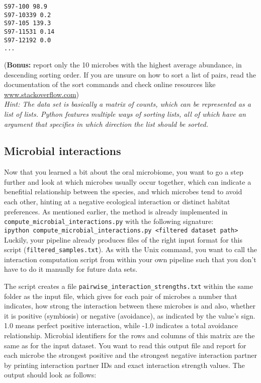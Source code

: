 \documentclass[12pt]{article}
\begin{document}
\begin{verbatim}
S97-100 98.9
S97-10339 0.2
S97-105 139.3
S97-11531 0.14
S97-12192 0.0
...
\end{verbatim}

\noindent(\textbf{Bonus:} report only the 10 microbes with the highest average abundance, in descending sorting order. If you are unsure on how to sort a list of pairs, read the documentation of the sort commands and check online resources like \url{www.stackoverflow.com})\\


\noindent\emph{Hint: The data set is basically a matrix of counts, which can be represented as a list of lists. Python features multiple ways of sorting lists, all of which have an argument that specifies in which direction the list should be sorted.}

\subsection{Microbial interactions}

Now that you learned a bit about the oral microbiome, you want to go a step further and look at which microbes usually occur together, which can indicate a benefitial relationship between the species, and which microbes tend to avoid each other, hinting at a negative ecological interaction or distinct habitat preferences. As mentioned earlier, the method is already implemented in \texttt{compute\_microbial\_interactions.py} with the following signature:\\

\noindent\verb|ipython compute_microbial_interactions.py <filtered dataset path>|\\

Luckily, your pipeline already produces files of the right input format for this script (\texttt{filtered\_samples.txt}). As with the Unix command, you want to call the interaction computation script from within your own pipeline such that you don't have to do it manually for future data sets.

The script creates a file \texttt{pairwise\_interaction\_strengths.txt} within the same folder as the input file, which gives for each pair of microbes a number that indicates, how strong the interaction between these microbes is and also, whether it is positive (symbiosis) or negative (avoidance), as indicated by the value's sign. 1.0 means perfect positive interaction, while -1.0 indicates a total avoidance relationship. Microbial identifiers for the rows and columns of this matrix are the same as for the input dataset. You want to read this output file and report for each microbe the strongest positive and the strongest negative interaction partner by printing interaction partner IDs and exact interaction strength values. The output should look as follows:
\end{document}

